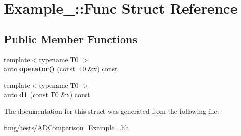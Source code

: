 \hypertarget{structExample__5_1_1Func}{\section{Example\-\_\-:\-:Func Struct Reference}
\label{structExample__5_1_1Func}
}
\subsection*{Public Member Functions}
\begin{DoxyCompactItemize}
\item 
\hypertarget{structExample__5_1_1Func_a45ab04b76c7c6c115b8adeb95bd6ee07}{{\footnotesize template$<$typename T0 $>$ }\\auto {\bfseries operator()} (const T0 \&x) const }\label{structExample__5_1_1Func_a45ab04b76c7c6c115b8adeb95bd6ee07}

\item 
\hypertarget{structExample__5_1_1Func_a82d9c9f1f3e1d2706960d4e1ad1ff8d8}{{\footnotesize template$<$typename T0 $>$ }\\auto {\bfseries d1} (const T0 \&x) const }\label{structExample__5_1_1Func_a82d9c9f1f3e1d2706960d4e1ad1ff8d8}

\end{DoxyCompactItemize}


The documentation for this struct was generated from the following file\-:\begin{DoxyCompactItemize}
\item 
fung/tests/A\-D\-Comparison\-\_\-\-Example\-\_.\-hh\end{DoxyCompactItemize}
